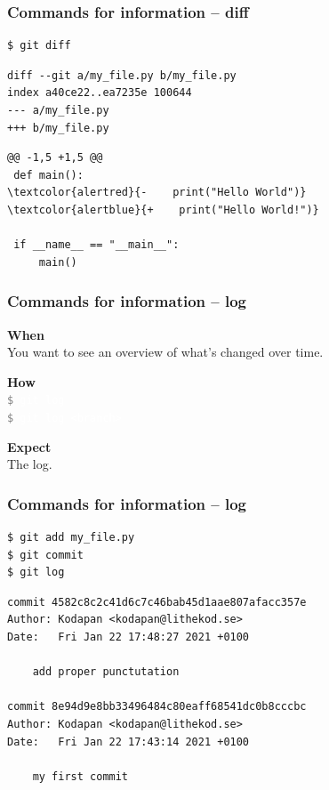 \documentclass{beamer}
\newcommand{\keyword}[1]{\hspace{-1.0em}\textcolor{lkblue}{\textbf{#1}}\vspace{0.2em}} %
\newcommand{\command}[1]{\colorbox{black!78}{\vphantom{Ep}\texttt{\textcolor{gray}{\$}
\textcolor{white}{#1}}}}
\begin{document}
\begin{frame}[fragile]
  \frametitle{Commands for information -- diff}

\begin{verbatim}
$ git diff
\end{verbatim}
\pause{}
\vspace{-2.4ex}
{
\color{gray}
\begin{Verbatim}[commandchars=\\\{\}]
diff --git a/my_file.py b/my_file.py
index a40ce22..ea7235e 100644
--- a/my_file.py
+++ b/my_file.py
\end{Verbatim}
}
\pause{}
\begin{Verbatim}[commandchars=\\\{\}]
@@ -1,5 +1,5 @@
 def main():
\textcolor{alertred}{-    print("Hello World")}
\textcolor{alertblue}{+    print("Hello World!")}
 
 if __name__ == "__main__":
     main()
\end{Verbatim}
\end{frame}

\begin{frame}
  \frametitle{Commands for information -- log}

  \keyword{When}\\
  You want to see an overview of what's changed over time.
  \vspace{0.5em}

  \keyword{How}\\
  \command{git log} \\
  \command{git log <branch>}
  \vspace{0.5em}

  \keyword{Expect}\\
  The log.
\end{frame}

\begin{frame}[fragile]
  \frametitle{Commands for information -- log}
\begin{Verbatim}
$ git add my_file.py
$ git commit
$ git log
\end{Verbatim}
\pause{}
\vspace{-1.2ex} %
\begin{Verbatim}
commit 4582c8c2c41d6c7c46bab45d1aae807afacc357e
Author: Kodapan <kodapan@lithekod.se>
Date:   Fri Jan 22 17:48:27 2021 +0100

    add proper punctutation

commit 8e94d9e8bb33496484c80eaff68541dc0b8cccbc
Author: Kodapan <kodapan@lithekod.se>
Date:   Fri Jan 22 17:43:14 2021 +0100

    my first commit
\end{Verbatim}
\end{frame}
\end{document}
